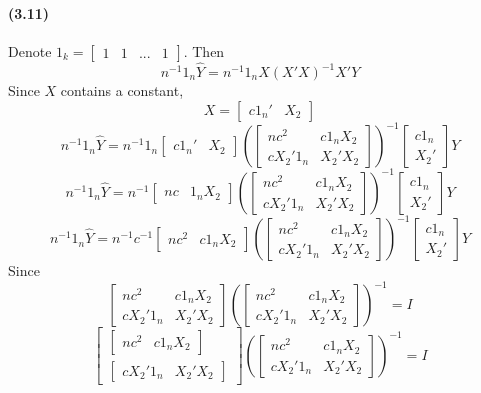 \documentclass[10pt,letter]{article}
\begin{document}
\paragraph{(3.11)}
Denote $1_k = \begin{bmatrix}
  1 & 1 & ... & 1
\end{bmatrix}$. Then
\[ n^{-1} 1_n \hat{Y} = n^{-1} 1_n X(X'X)^{-1}X' Y \]
Since $X$ contains a constant,
\[ X = \begin{bmatrix} c 1_n' & X_2 \end{bmatrix} \]
\[ n^{-1} 1_n \hat{Y} = n^{-1} 1_n \begin{bmatrix} c 1_n' & X_2 \end{bmatrix}\left(\begin{bmatrix} nc^2 & c 1_n X_2 \\ c X_2'1_n & X_2'X_2 \end{bmatrix}\right)^{-1}\begin{bmatrix} c 1_n \\ X_2' \end{bmatrix} Y \]
\[ n^{-1} 1_n \hat{Y} = n^{-1} \begin{bmatrix} n c & 1_n X_2 \end{bmatrix}\left(\begin{bmatrix} nc^2 & c 1_n X_2 \\ c X_2'1_n & X_2'X_2 \end{bmatrix}\right)^{-1}\begin{bmatrix} c 1_n \\ X_2' \end{bmatrix} Y \]
\[ n^{-1} 1_n \hat{Y} = n^{-1}c^{-1} \begin{bmatrix} n c^2 & c1_n X_2 \end{bmatrix}\left(\begin{bmatrix} nc^2 & c 1_n X_2 \\ c X_2'1_n & X_2'X_2 \end{bmatrix}\right)^{-1}\begin{bmatrix} c 1_n \\ X_2' \end{bmatrix} Y \]
Since
\[ \begin{bmatrix} n c^2 & c1_n X_2 \\ c X_2'1_n & X_2'X_2 \end{bmatrix}\left(\begin{bmatrix} nc^2 & c 1_n X_2 \\ c X_2'1_n & X_2'X_2 \end{bmatrix}\right)^{-1} = I \]
\[\begin{bmatrix} \begin{bmatrix} n c^2 & c1_n X_2 \end{bmatrix} \\ \begin{bmatrix} c X_2'1_n & X_2'X_2 \end{bmatrix} \end{bmatrix}\left(\begin{bmatrix} nc^2 & c 1_n X_2 \\ c X_2'1_n & X_2'X_2 \end{bmatrix}\right)^{-1} = I \]
\end{document}
